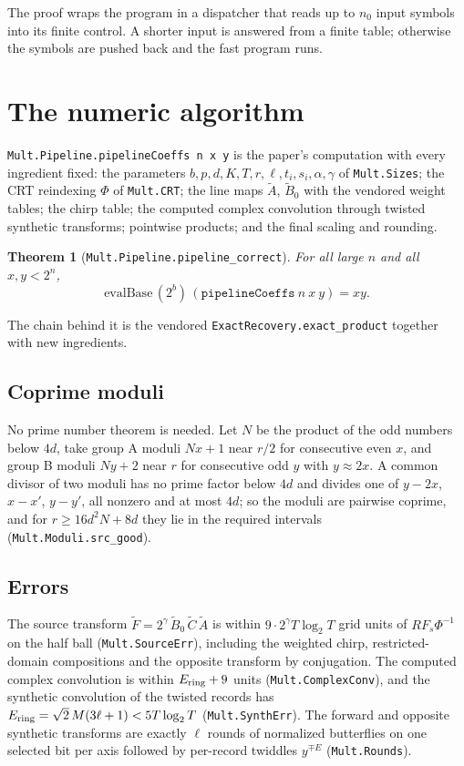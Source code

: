 \documentclass[11pt]{amsart}
\newtheorem{theorem}{Theorem}
\theoremstyle{remark}
\begin{document}
The proof wraps the program in a dispatcher that reads up to $n_0$ input symbols into its finite
control. A shorter input is answered from a finite table; otherwise the symbols are pushed back
and the fast program runs.

\section{The numeric algorithm}

\texttt{Mult.Pipeline.pipelineCoeffs n x y} is the paper's computation with every ingredient
fixed: the parameters $b,p,d,K,T,r,\ell,t_i,s_i,\alpha,\gamma$ of \texttt{Mult.Sizes}; the CRT
reindexing $\Phi$ of \texttt{Mult.CRT}; the line maps $\widetilde A$, $\widetilde B_0$ with the
vendored weight tables; the chirp table; the computed complex convolution through twisted
synthetic transforms; pointwise products; and the final scaling and rounding.

\begin{theorem}[\texttt{Mult.Pipeline.pipeline\_correct}]
For all large $n$ and all $x,y<2^n$,
\[
 \mathrm{evalBase}\,(2^{b})\,(\texttt{pipelineCoeffs}\ n\ x\ y)=xy.
\]
\end{theorem}

The chain behind it is the vendored \texttt{ExactRecovery.exact\_product} together with new
ingredients.

\subsection*{Coprime moduli}
No prime number theorem is needed. Let $N$ be the product of the odd numbers below $4d$, take
group A moduli $Nx+1$ near $r/2$ for consecutive even $x$, and group B moduli $Ny+2$ near $r$
for consecutive odd $y$ with $y\approx 2x$. A common divisor of two moduli has no prime factor
below $4d$ and divides one of $y-2x$, $x-x'$, $y-y'$, all nonzero and at most $4d$; so the
moduli are pairwise coprime, and for $r\ge 16d^2N+8d$ they lie in the required intervals
(\texttt{Mult.Moduli.src\_good}).

\subsection*{Errors}
The source transform $\widetilde F=2^\gamma\,\widetilde B_0\,\widetilde C\,\widetilde A$ is
within $9\cdot 2^\gamma T\log_2 T$ grid units of $RF_s\Phi^{-1}$ on the half ball
(\texttt{Mult.SourceErr}), including the weighted chirp, restricted-domain compositions and the
opposite transform by conjugation. The computed complex convolution is within
$E_{\rm ring}+9$ units (\texttt{Mult.ComplexConv}), and the synthetic convolution of the twisted
records has $E_{\rm ring}=\sqrt2\,M(3\ell+1)<5T\log_2 T$ (\texttt{Mult.SynthErr}). The forward
and opposite synthetic transforms are exactly $\ell$ rounds of normalized butterflies on one
selected bit per axis followed by per-record twiddles $y^{\mp E}$ (\texttt{Mult.Rounds}).
\end{document}
